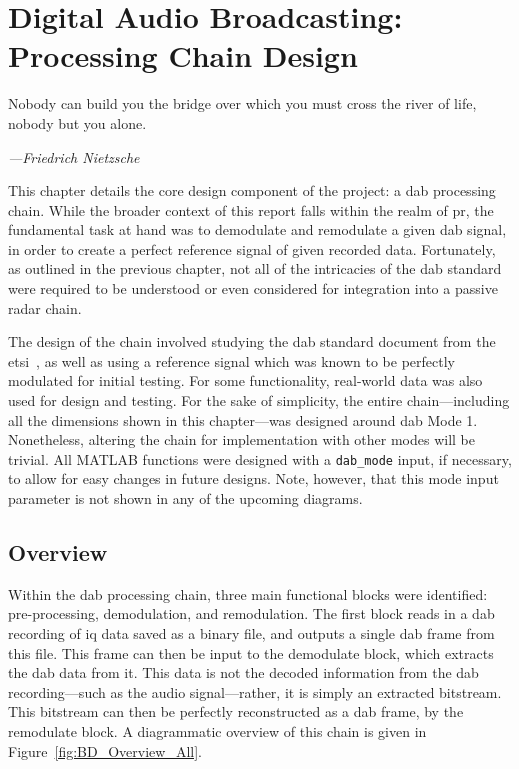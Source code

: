\documentclass[class=report,11pt,crop=false]{standalone}
\begin{document}
\ifstandalone
\tableofcontents
\fi
\chapter{Digital Audio Broadcasting: Processing Chain Design}
\epigraph{Nobody can build you the bridge over which you must cross the river of life, nobody but you alone.}%
    {\emph{---Friedrich Nietzsche}}

This chapter details the core design component of the project: a \gls{dab} processing chain. While the broader context of this report falls within the realm of \gls{pr}, the fundamental task at hand was to demodulate and remodulate a given \gls{dab} signal, in order to create a perfect reference signal of given recorded data. Fortunately, as outlined in the previous chapter, not all of the intricacies of the \gls{dab} standard were required to be understood or even considered for integration into a passive radar chain.

The design of the chain involved studying the \gls{dab} standard document from the \gls{etsi}~\cite{dabstandard}, as well as using a reference signal which was known to be perfectly modulated for initial testing. For some functionality, real-world data was also used for design and testing. For the sake of simplicity, the entire chain---including all the dimensions shown in this chapter---was designed around \gls{dab} Mode 1. Nonetheless, altering the chain for implementation with other modes will be trivial. All MATLAB functions were designed with a \texttt{dab\_mode} input, if necessary, to allow for easy changes in future designs. Note, however, that this mode input parameter is not shown in any of the upcoming diagrams.

\section{Overview}
Within the \gls{dab} processing chain, three main functional blocks were identified: pre-processing, demodulation, and remodulation. The first block reads in a \gls{dab} recording of \gls{iq} data saved as a binary file, and outputs a single \gls{dab} frame from this file. This frame can then be input to the demodulate block, which extracts the \gls{dab} data from it. This data is not the decoded information from the \gls{dab} recording---such as the audio signal---rather, it is simply an extracted bitstream. This bitstream can then be perfectly reconstructed as a \gls{dab} frame, by the remodulate block. A diagrammatic overview of this chain is given in Figure~\ref{fig:BD_Overview_All}.
\end{document}
